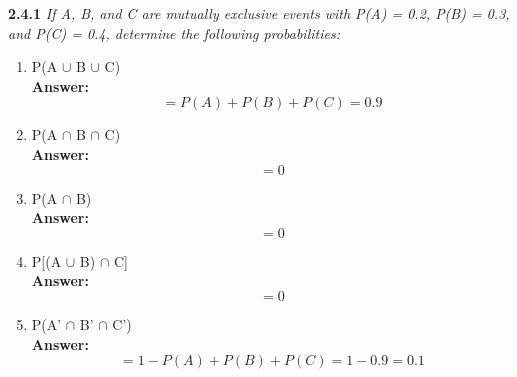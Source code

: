 \documentclass[11pt]{article}
\begin{document}
\noindent \textbf{2.4.1} \emph{ If A, B, and C are mutually exclusive events with P(A) = 0.2, P(B) = 0.3, and P(C) = 0.4, determine the following probabilities:}
\begin{enumerate}
\item P(A $\cup$ B $\cup$ C)
\\\textbf{Answer: }
\begin{equation}
 = P(A) + P(B) + P(C) = 0.9
\end{equation}
\item P(A $\cap$ B $\cap$ C)
\\\textbf{Answer: }
\begin{equation}
 = 0
\end{equation}

\item P(A $\cap$ B)
\\\textbf{Answer: }
\begin{equation}
 = 0
\end{equation}

\item P[(A $\cup$ B) $\cap$ C]
\\\textbf{Answer: }
\begin{equation}
 = 0
\end{equation}

\item P(A' $\cap$ B' $\cap$ C')
\\\textbf{Answer: }
\begin{equation}
 = 1 - P(A) + P(B) + P(C) = 1 - 0.9 = 0.1
\end{equation}
\end{enumerate}
\end{document}
